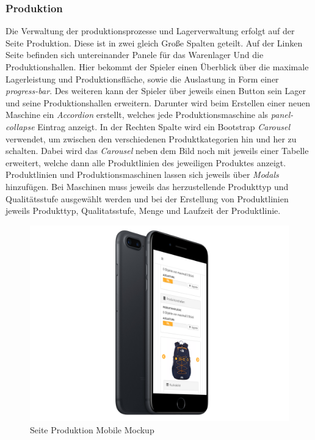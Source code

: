 \subsubsection{Produktion}
Die Verwaltung der produktionsprozesse und Lagerverwaltung erfolgt auf der Seite Produktion. Diese ist in zwei gleich Große Spalten geteilt. Auf der Linken Seite befinden sich untereinander Panele für das Warenlager Und die Produktionshallen. Hier bekommt der Spieler einen Überblick über die maximale Lagerleistung und Produktionsfläche, sowie die Auslastung in Form einer \textit{progress-bar}. Des weiteren kann der Spieler über jeweils einen Button sein Lager und seine Produktionshallen erweitern. Darunter wird beim Erstellen einer neuen Maschine ein \textit{Accordion} erstellt, welches jede Produktionsmaschine als \textit{panel-collapse} Eintrag anzeigt. In der Rechten Spalte wird ein Bootstrap \textit{Carousel} verwendet, um zwischen den verschiedenen Produktkategorien hin und her zu schalten. Dabei wird das \textit{Carousel} neben dem Bild noch mit jeweils einer Tabelle erweitert, welche dann alle Produktlinien des jeweiligen Produktes anzeigt. Produktlinien und Produktionsmaschinen lassen sich jeweils über \textit{Modals}  hinzufügen. Bei Maschinen muss jeweils das herzustellende Produkttyp und Qualitätsstufe ausgewählt werden und bei der Erstellung von Produktlinien jeweils Produkttyp, Qualitatsstufe, Menge und Laufzeit der Produktlinie.
\begin{figure}
	\centering
	\includegraphics[scale=0.15]{img/mock2.png}
	\captionsetup{format=hang}
	\caption[Seite Produktion Mobile Mockup]{\label{fig:produktion}Seite Produktion Mobile Mockup}
\end{figure}

